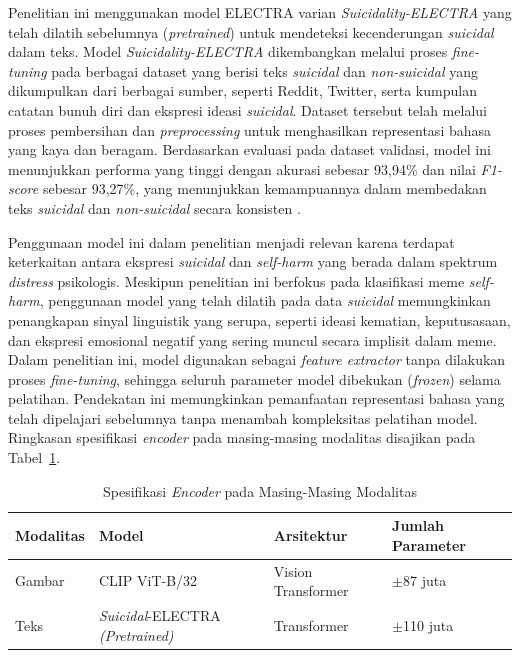 Penelitian ini menggunakan model ELECTRA varian \textit{Suicidality-ELECTRA} yang telah dilatih sebelumnya (\textit{pretrained}) untuk mendeteksi kecenderungan \textit{suicidal} dalam teks. Model \textit{Suicidality-ELECTRA} dikembangkan melalui proses \textit{fine-tuning} pada berbagai dataset yang berisi teks \textit{suicidal} dan \textit{non-suicidal} yang dikumpulkan dari berbagai sumber, seperti Reddit, Twitter, serta kumpulan catatan bunuh diri dan ekspresi ideasi \textit{suicidal}. Dataset tersebut telah melalui proses pembersihan dan \textit{preprocessing} untuk menghasilkan representasi bahasa yang kaya dan beragam.  Berdasarkan evaluasi pada dataset validasi, model ini menunjukkan performa yang tinggi dengan akurasi sebesar 93,94\% dan nilai \textit{F1-score} sebesar 93,27\%, yang menunjukkan kemampuannya dalam membedakan teks \textit{suicidal} dan \textit{non-suicidal} secara konsisten \cite{Dus2022SuicidalElectra}.

Penggunaan model ini dalam penelitian menjadi relevan karena terdapat keterkaitan antara ekspresi \textit{suicidal} dan \textit{self-harm} yang berada dalam spektrum \textit{distress} psikologis. Meskipun penelitian ini berfokus pada klasifikasi meme \textit{self-harm}, penggunaan model yang telah dilatih pada data \textit{suicidal} memungkinkan penangkapan sinyal linguistik yang serupa, seperti ideasi kematian, keputusasaan, dan ekspresi emosional negatif yang sering muncul secara implisit dalam meme. Dalam penelitian ini, model digunakan sebagai \textit{feature extractor} tanpa dilakukan proses \textit{fine-tuning}, sehingga seluruh parameter model dibekukan (\textit{frozen}) selama pelatihan. Pendekatan ini memungkinkan pemanfaatan representasi bahasa yang telah dipelajari sebelumnya tanpa menambah kompleksitas pelatihan model. Ringkasan spesifikasi \textit{encoder} pada masing-masing modalitas disajikan pada Tabel~\ref{tabel:spesifikasi_encoder_modalitas}.

\begin{table}[H]
    \centering
    \caption{Spesifikasi \textit{Encoder} pada Masing-Masing Modalitas}
    \label{tabel:spesifikasi_encoder_modalitas}
    \small
    \setlength{\tabcolsep}{3pt}
    \renewcommand{\arraystretch}{1.1}
    \begin{tabular}{p{1.7cm} p{3.2cm} p{3.0cm} p{2cm}}
        \hline
        \textbf{Modalitas} & \textbf{Model} & \textbf{Arsitektur} & \textbf{Jumlah Parameter} \\
        \hline
        Gambar & CLIP ViT-B/32 & Vision Transformer & $\pm$87 juta \\
        Teks & \textit{Suicidal}-ELECTRA \textit{(Pretrained)} & Transformer  & $\pm$110 juta \\
        \hline
    \end{tabular}
\end{table}


